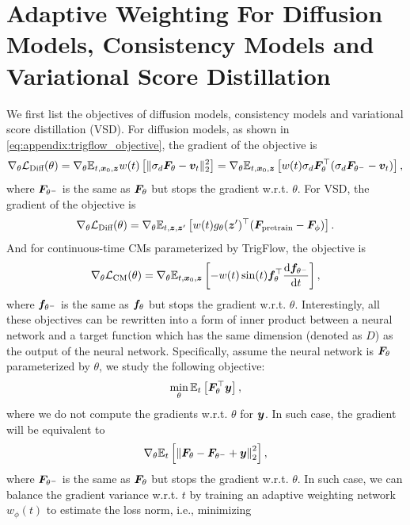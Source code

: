 \section{Adaptive Weighting For Diffusion Models, Consistency Models and Variational Score Distillation}
\label{appendix:adaptive_weighting}

We first list the objectives of diffusion models, consistency models and variational score distillation (VSD).
For diffusion models, as shown in \eqref{eq:appendix:trigflow_objective}, the gradient of the objective is
\begin{equation*}
    \nabla_{\theta}\mathcal{L}_{\text{Diff}}(\theta) = \nabla_{\theta}\mathbb{E}_{t,{\bm{x}}_0,{\bm{z}}} w(t)\left[ \| \sigma_d{\bm{F}}_\theta - {\bm{v}}_t \|_2^2 \right] = \nabla_{\theta}\mathbb{E}_{t,{\bm{x}}_0,{\bm{z}}} \left[ w(t)\sigma_d{\bm{F}}_\theta^\top (\sigma_d{\bm{F}}_{\theta^-} - {\bm{v}}_t) \right],
\end{equation*}
where ${\bm{F}}_{\theta^-}$ is the same as ${\bm{F}}_\theta$ but stops the gradient w.r.t. $\theta$. For VSD, the gradient of the objective is
\begin{equation*}
    \nabla_{\theta}\mathcal{L}_{\text{Diff}}(\theta) = \nabla_\theta \mathbb{E}_{t,{\bm{z}},{\bm{z}}'}\left[
        w(t)g_\theta({\bm{z}}')^\top ({\bm{F}}_{\text{pretrain}} - {\bm{F}}_\phi)
    \right].
\end{equation*}
And for continuous-time CMs parameterized by TrigFlow, the objective is
\begin{equation*}
    \nabla_\theta \mathcal{L}_{\text{CM}}(\theta) = \nabla_{\theta}\mathbb{E}_{t,{\bm{x}}_0,{\bm{z}}}\left[
        -w(t)\sin(t){\bm{f}}_\theta^\top \frac{\mathrm{d} {\bm{f}}_{\theta^-}}{\mathrm{d} t} 
    \right],
\end{equation*}
where ${\bm{f}}_{\theta^-}$ is the same as ${\bm{f}}_\theta$ but stops the gradient w.r.t. $\theta$. Interestingly, all these objectives can be rewritten into a form of inner product between a neural network and a target function which has the same dimension (denoted as $D$) as the output of the neural network. Specifically, assume the neural network is ${\bm{F}}_\theta$ parameterized by $\theta$, we study the following objective:
\[
    \min_\theta \mathbb{E}_t\left[
        {\bm{F}}_\theta^\top {\bm{y}}
    \right],
\]
where we do not compute the gradients w.r.t. $\theta$ for ${\bm{y}}$. In such case, the gradient will be equivalent to
\[
    \nabla_\theta \mathbb{E}_t\left[
        \left\|{\bm{F}}_\theta - {\bm{F}}_{\theta^-} + {\bm{y}}\right\|_2^2
    \right],
\]
where ${\bm{F}}_{\theta^-}$ is the same as ${\bm{F}}_\theta$ but stops the gradient w.r.t. $\theta$. In such case, we can balance the gradient variance w.r.t. $t$ by training an adaptive weighting network $w_\phi(t)$ to estimate the loss norm, i.e., minimizing
